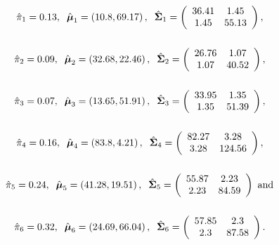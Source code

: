 \[
\begin{array}{l@{\hskip 0.1in}l@{\hskip 0.1in}c }
\hat{\pi}_1 = 0.13, & \hat{\m\mu}_1 = \left(10.8,69.17\right), & \hat{\m\Sigma}_1 = \left(
\begin{array}{cc}
36.41&1.45 \\ 
1.45&55.13 \\ 
\end{array}
\right), \\ & &\\ 
\end{array}
\]
\[
\begin{array}{l@{\hskip 0.1in}l@{\hskip 0.1in}c }
\hat{\pi}_2 = 0.09, & \hat{\m\mu}_2 = \left(32.68,22.46\right), & \hat{\m\Sigma}_2 = \left(
\begin{array}{cc}
26.76&1.07 \\ 
1.07&40.52 \\ 
\end{array}
\right), \\ & &\\ 
\end{array}
\]
\[
\begin{array}{l@{\hskip 0.1in}l@{\hskip 0.1in}c }
\hat{\pi}_3 = 0.07, & \hat{\m\mu}_3 = \left(13.65,51.91\right), & \hat{\m\Sigma}_3 = \left(
\begin{array}{cc}
33.95&1.35 \\ 
1.35&51.39 \\ 
\end{array}
\right), \\ & &\\ 
\end{array}
\]
\[
\begin{array}{l@{\hskip 0.1in}l@{\hskip 0.1in}c }
\hat{\pi}_4 = 0.16, & \hat{\m\mu}_4 = \left(83.8,4.21\right), & \hat{\m\Sigma}_4 = \left(
\begin{array}{cc}
82.27&3.28 \\ 
3.28&124.56 \\ 
\end{array}
\right), \\ & &\\ 
\end{array}
\]
\[
\begin{array}{l@{\hskip 0.1in}l@{\hskip 0.1in}c }
\hat{\pi}_5 = 0.24, & \hat{\m\mu}_5 = \left(41.28,19.51\right), & \hat{\m\Sigma}_5 = \left(
\begin{array}{cc}
55.87&2.23 \\ 
2.23&84.59 \\ 
\end{array}
\right) \text{ and} \\ & &\\ 
\end{array}
\]
\[
\begin{array}{l@{\hskip 0.1in}l@{\hskip 0.1in}c }
\hat{\pi}_6 = 0.32, & \hat{\m\mu}_6 = \left(24.69,66.04\right), & \hat{\m\Sigma}_6 = \left(
\begin{array}{cc}
57.85&2.3 \\ 
2.3&87.58 \\ 
\end{array}
\right). \\ & &\\ 
\end{array}
\]
